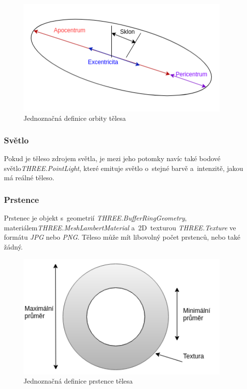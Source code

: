 \documentclass[a4paper,12pt]{article}
\begin{document}



\begin{figure}[H]
\begin{center}
\includegraphics[width=300pt]{Images/OrbitData.png}
\caption[Jednoznačná definice orbity tělesa]{Jednoznačná definice orbity tělesa \footnotemark[1]}
\end{center}
\end{figure}


\subsubsection{Světlo}

Pokud je těleso zdrojem světla, je mezi jeho potomky navíc také bodové světlo\newline \textit{THREE.PointLight}, které emituje světlo o~stejné barvě a~intenzitě, jakou má reálné těleso.

\subsubsection{Prstence}

Prstenec je objekt s~geometrií \textit{THREE.BufferRingGeometry}, materiálem\newline \textit{THREE.MeshLambertMaterial} a~2D~texturou \textit{THREE.Texture} ve formátu \textit{JPG} nebo \textit{PNG}. Těleso může mít libovolný počet prstenců, nebo také žádný.

\begin{figure}[H]
\begin{center}
\includegraphics[width=300pt]{Images/RingData.png}
\caption[Jednoznačná definice prstence tělesa]{Jednoznačná definice prstence tělesa \footnotemark[1]}
\end{center}
\end{figure}
\end{document}

